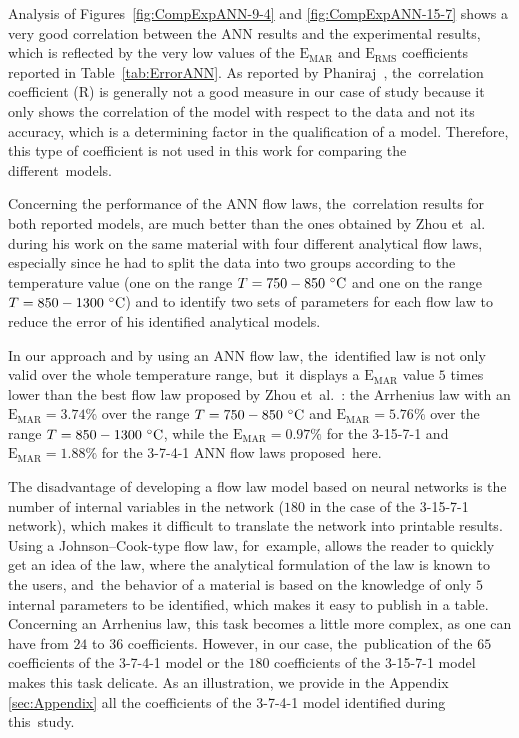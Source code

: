 \documentclass[algorithms,article,accept,pdftex,moreauthors]{Definitions/mdpi}
\DeclareRobustCommand{\RMSE}{\text{E}_\text{RMS}}
\DeclareRobustCommand{\MARE}{\text{E}_\text{MAR}}
\DeclareRobustCommand{\R}{\text{R}}
\begin{document}
Analysis of Figures~\ref{fig:CompExpANN-9-4} and \ref{fig:CompExpANN-15-7} shows a very good correlation between the ANN results and the experimental results, which is reflected by the very low values of the $\MARE$ and $\RMSE$ coefficients reported in Table~\ref{tab:ErrorANN}.
As reported by Phaniraj~\cite{Phaniraj-2003}, the~correlation coefficient ($\R$) is generally not a good measure in our case of study because it only shows the correlation of the model with respect to the data and not its accuracy, which is a determining factor in the qualification of a model.
Therefore, this type of coefficient is not used in this work for comparing the different~models.

Concerning the performance of the ANN flow laws, the~correlation results for both reported models, are much better than the ones obtained by Zhou et~al.~\cite{Zhou-2020} during his work on the same material with four different analytical flow laws, especially since he had to split the data into two groups according to the temperature value (one on the range \mbox{$T=750-850~\celsius$} and one on the range \mbox{$T=850-1300~\celsius$}) and to identify two sets of parameters for each flow law to reduce the error of his identified analytical models.

In our approach and by using an ANN flow law, the~identified law is not only valid over the whole temperature range, but~it displays a $\MARE$ value $5$ times lower than the best flow law proposed by Zhou et~al.~\cite{Zhou-2020}: the Arrhenius law with an $\MARE=3.74\%$ over the range $T=750-850~\celsius$ and $\MARE=5.76\%$ over the range $T=850-1300~\celsius$, while the $\MARE=0.97\%$ for the 3-15-7-1 and $\MARE=1.88\%$ for the 3-7-4-1 ANN flow laws proposed~here.

The disadvantage of developing a flow law model based on neural networks is the number of internal variables in the network ($180$ in the case of the 3-15-7-1 network), which makes it difficult to translate the network into printable results.
Using a Johnson--Cook-type flow law, for~example, allows the reader to quickly get an idea of the law, where the analytical formulation of the law is known to the users, and~the behavior of a material is based on the knowledge of only $5$ internal parameters to be identified, which makes it easy to publish in a table.
Concerning an Arrhenius law, this task becomes a little more complex, as one can have from $24$ to $36$ coefficients.
However, in our case, the~publication of the $65$ coefficients of the 3-7-4-1 model or the $180$ coefficients of the 3-15-7-1 model makes this task delicate.
As an illustration, we provide in the Appendix \ref{sec:Appendix} all the coefficients of the 3-7-4-1 model identified during this~study.
\end{document}
